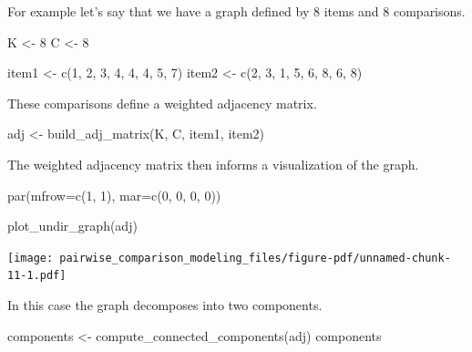 \documentclass[
  letterpaper,
  DIV=11,
  numbers=noendperiod]{scrartcl}
\newenvironment{Shaded}{\begin{snugshade}}{\end{snugshade}}
\newcommand{\AttributeTok}[1]{\textcolor[rgb]{0.40,0.45,0.13}{#1}}
\newcommand{\DecValTok}[1]{\textcolor[rgb]{0.68,0.00,0.00}{#1}}
\newcommand{\FunctionTok}[1]{\textcolor[rgb]{0.28,0.35,0.67}{#1}}
\newcommand{\NormalTok}[1]{\textcolor[rgb]{0.00,0.23,0.31}{#1}}
\newcommand{\OtherTok}[1]{\textcolor[rgb]{0.00,0.23,0.31}{#1}}
\begin{document}
For example let's say that we have a graph defined by \(8\) items and
\(8\) comparisons.

\begin{Shaded}
\begin{Highlighting}[]
\NormalTok{K }\OtherTok{\textless{}{-}} \DecValTok{8}
\NormalTok{C }\OtherTok{\textless{}{-}} \DecValTok{8}

\NormalTok{item1 }\OtherTok{\textless{}{-}} \FunctionTok{c}\NormalTok{(}\DecValTok{1}\NormalTok{, }\DecValTok{2}\NormalTok{, }\DecValTok{3}\NormalTok{, }\DecValTok{4}\NormalTok{, }\DecValTok{4}\NormalTok{, }\DecValTok{4}\NormalTok{, }\DecValTok{5}\NormalTok{, }\DecValTok{7}\NormalTok{)}
\NormalTok{item2 }\OtherTok{\textless{}{-}} \FunctionTok{c}\NormalTok{(}\DecValTok{2}\NormalTok{, }\DecValTok{3}\NormalTok{, }\DecValTok{1}\NormalTok{, }\DecValTok{5}\NormalTok{, }\DecValTok{6}\NormalTok{, }\DecValTok{8}\NormalTok{, }\DecValTok{6}\NormalTok{, }\DecValTok{8}\NormalTok{)}
\end{Highlighting}
\end{Shaded}

These comparisons define a weighted adjacency matrix.

\begin{Shaded}
\begin{Highlighting}[]
\NormalTok{adj }\OtherTok{\textless{}{-}} \FunctionTok{build\_adj\_matrix}\NormalTok{(K, C, item1, item2)}
\end{Highlighting}
\end{Shaded}

The weighted adjacency matrix then informs a visualization of the graph.

\begin{Shaded}
\begin{Highlighting}[]
\FunctionTok{par}\NormalTok{(}\AttributeTok{mfrow=}\FunctionTok{c}\NormalTok{(}\DecValTok{1}\NormalTok{, }\DecValTok{1}\NormalTok{), }\AttributeTok{mar=}\FunctionTok{c}\NormalTok{(}\DecValTok{0}\NormalTok{, }\DecValTok{0}\NormalTok{, }\DecValTok{0}\NormalTok{, }\DecValTok{0}\NormalTok{))}

\FunctionTok{plot\_undir\_graph}\NormalTok{(adj)}
\end{Highlighting}
\end{Shaded}

\texttt{[image: pairwise\_comparison\_modeling\_files/figure-pdf/unnamed-chunk-11-1.pdf]}

In this case the graph decomposes into two components.

\begin{Shaded}
\begin{Highlighting}[]
\NormalTok{components }\OtherTok{\textless{}{-}} \FunctionTok{compute\_connected\_components}\NormalTok{(adj)}
\NormalTok{components}
\end{Highlighting}
\end{Shaded}
\end{document}
